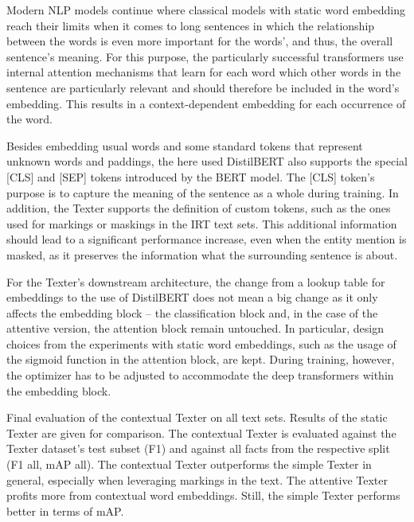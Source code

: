 Modern NLP models continue where classical models with static word embedding reach their limits when it comes to long sentences in which the relationship between the words is even more important for the words', and thus, the overall sentence's meaning. For this purpose, the particularly successful transformers use internal attention mechanisms that learn for each word which other words in the sentence are particularly relevant and should therefore be included in the word's embedding. This results in a context-dependent embedding for each occurrence of the word.

Besides embedding usual words and some standard tokens that represent unknown words and paddings, the here used DistilBERT also supports the special [CLS] and [SEP] tokens introduced by the BERT model. The [CLS] token's purpose is to capture the meaning of the sentence as a whole during training. In addition, the Texter supports the definition of custom tokens, such as the ones used for markings or maskings in the IRT text sets. This additional information should lead to a significant performance increase, even when the entity mention is masked, as it preserves the information what the surrounding sentence is about.

For the Texter's downstream architecture, the change from a lookup table for embeddings to the use of DistilBERT does not mean a big change as it only affects the embedding block -- the classification block and, in the case of the attentive version, the attention block remain untouched. In particular, design choices from the experiments with static word embeddings, such as the usage of the sigmoid function in the attention block, are kept. During training, however, the optimizer has to be adjusted to accommodate the deep transformers within the embedding block.

\begin{table}
    \makebox[\textwidth][c]{
        
    }
    \caption{Final evaluation of the contextual Texter on all text sets. Results of the static Texter are given for comparison. The contextual Texter is evaluated against the Texter dataset's test subset (F1) and against all facts from the respective split (F1 all, mAP all). The contextual Texter outperforms the simple Texter in general, especially when leveraging markings in the text. The attentive Texter profits more from contextual word embeddings. Still, the simple Texter performs better in terms of mAP.}
    \label{tab:5_experiments/3_texter/3_context/results}
\end{table}

